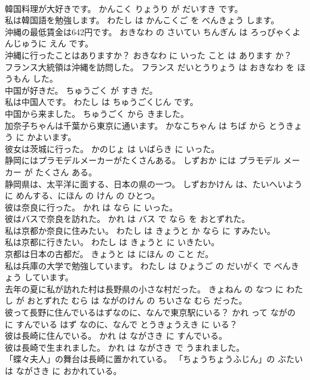 \documentclass[8pt]{extreport}
\begin{document}
\begin{CJK}{UTF8}{min}
\\	韓国料理が大好きです。	かんこく りょうり が だいすき です。	
\\	私は韓国語を勉強します。	わたし は かんこくご を べんきょう します。	
\\	沖縄の最低賃金は642円です。	おきなわ の さいてい ちんぎん は ろっぴゃくよんじゅうに えん です。	
\\	沖縄に行ったことはありますか？	おきなわ に いった こと は あります か？	
\\	フランス大統領は沖縄を訪問した。	フランス だいとうりょう は おきなわ を ほうもん した。	
\\	中国が好きだ。	ちゅうごく が すき だ。	
\\	私は中国人です。	わたし は ちゅうごくじん です。	
\\	中国から来ました。	ちゅうごく から きました。	
\\	加奈子ちゃんは千葉から東京に通います。	かなこちゃん は ちば から とうきょう に かよいます。	
\\	彼女は茨城に行った。	かのじょ は いばらき に いった。	
\\	静岡にはプラモデルメーカーがたくさんある。	しずおか には プラモデル メーカー が たくさん ある。	
\\	静岡県は、太平洋に面する、日本の県の一つ。	しずおかけん は、たいへいよう に めんする、にほん の けん の ひとつ。	
\\	彼は奈良に行った。	かれ は なら に いった。	
\\	彼はバスで奈良を訪れた。	かれ は バス で なら を おとずれた。	
\\	私は京都か奈良に住みたい。	わたし は きょうと か なら に すみたい。	
\\	私は京都に行きたい。	わたし は きょうと に いきたい。	
\\	京都は日本の古都だ。	きょうと は にほん の こと だ。	
\\	私は兵庫の大学で勉強しています。	わたし は ひょうご の だいがく で べんきょう しています。	
\\	去年の夏に私が訪れた村は長野県の小さな村だった。	きょねん の なつ に わたし が おとずれた むら は ながのけん の ちいさな むら だった。	
\\	彼って長野に住んでいるはずなのに、なんで東京駅にいる？	かれ って ながの に すんでいる はず なのに、なんで とうきょうえき に いる？	
\\	彼は長崎に住んでいる。	かれ は ながさき に すんでいる。	
\\	彼は長崎で生まれました。	かれ は ながさき で うまれました。	
\\	「蝶々夫人」の舞台は長崎に置かれている。	「ちょうちょうふじん」の ぶたい は ながさき に おかれている。	

\end{CJK}
\end{document}
